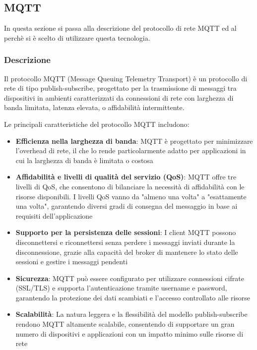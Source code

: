 \subsection{MQTT}
In questa sezione si passa alla descrizione del protocollo di rete MQTT ed al perchè si è scelto di utilizzare questa tecnologia.

\subsubsection{Descrizione}
Il protocollo MQTT (Message Queuing Telemetry Transport) è un protocollo di rete di tipo publish-subscribe, progettato per la trasmissione di messaggi tra dispositivi in ambienti caratterizzati da connessioni di rete con larghezza di banda limitata, latenza elevata, o affidabilità intermittente.

\noindent Le principali caratteristiche del protocollo MQTT includono:

\begin{itemize}
  \item \textbf{Efficienza nella larghezza di banda}: MQTT è progettato per minimizzare l'overhead di rete, il che lo rende particolarmente adatto per applicazioni in cui la larghezza di banda è limitata o costosa
    
  \item \textbf{Affidabilità e livelli di qualità del servizio (QoS)}: MQTT offre tre livelli di QoS, che consentono di bilanciare la necessità di affidabilità con le risorse disponibili. I livelli QoS vanno da "almeno una volta" a "esattamente una volta", garantendo diversi gradi di consegna del messaggio in base ai requisiti dell'applicazione
    
  \item \textbf{Supporto per la persistenza delle sessioni}: I client MQTT possono disconnettersi e riconnettersi senza perdere i messaggi inviati durante la disconnessione, grazie alla capacità del broker di mantenere lo stato delle sessioni e gestire i messaggi pendenti

  \item \textbf{Sicurezza}: MQTT può essere configurato per utilizzare connessioni cifrate (SSL/TLS) e supporta l'autenticazione tramite username e password, garantendo la protezione dei dati scambiati e l'accesso controllato alle risorse

  \item \textbf{Scalabilità}: La natura leggera e la flessibilità del modello publish-subscribe rendono MQTT altamente scalabile, consentendo di supportare un gran numero di dispositivi e applicazioni con un impatto minimo sulle risorse di rete
\end{itemize}

